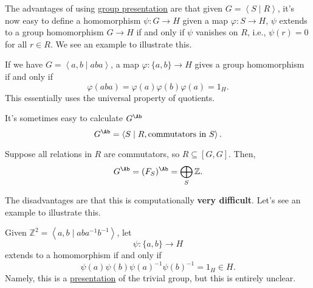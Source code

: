 \begin{remark}
	The advantages of using \hyperref[def:group-presentation]{group presentation} are that given \(G = \left< S \mid R \right> \), it's now easy to define
	a homomorphism \(\psi \colon G\to H\) given a map \(\varphi \colon S\to H\), \(\psi \) extends to a group homomorphism \(G\to H\) if and only if \(\psi \)
	vanishes on \(R\), i.e., \(\psi (r) = 0\) for all \(r\in R\). We see an example to illustrate this.

	\begin{eg}
		If we have \(G = \left< a, b \mid aba \right> \), a map \(\varphi \colon \{a, b\}\to H\) gives a group homomorphism if and only if
		\[
			\varphi (aba) = \varphi (a)\varphi (b)\varphi (a) = 1_H.
		\]
		This essentially uses the universal property of quotients.
	\end{eg}
\end{remark}

\begin{remark}
	It's sometimes easy to calculate \(G^{\Ab}\)
	\[
		G^{\Ab} = \left< S \mid R, \text{commutators in \(S\)}\right>.
	\]
	\begin{eg}
		Suppose all relations in \(R\) are commutators, so \(R\subseteq[G, G]\). Then,
		\[
			G^{\Ab} = (F_S)^{\Ab} = \bigoplus_S \mathbb{Z}.
		\]
	\end{eg}
\end{remark}
\begin{remark}
	The disadvantages are that this is computationally \textbf{very difficult}. Let's see an example to illustrate this.
	\begin{eg}
		Given \(\mathbb{Z} ^2 = \left< a, b \mid aba^{-1} b^{-1}  \right> \), let
		\[
			\psi \colon \{a, b\}\to H
		\]
		extends to a homomorphism if and only if
		\[
			\psi (a)\psi (b)\psi (a)^{-1} \psi (b)^{-1} = 1_H\in H.
		\]
		Namely, this is a \hyperref[def:group-presentation]{presentation} of the trivial group, but this is entirely unclear.
	\end{eg}
\end{remark}